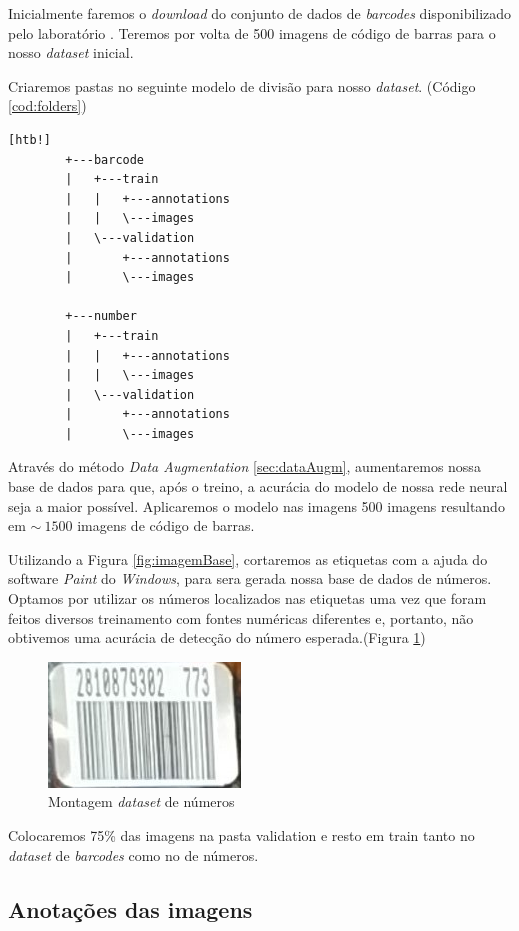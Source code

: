 Inicialmente faremos o \textit{download} do conjunto de dados de \textit{barcodes} disponibilizado pelo laboratório \citeauthor{Arte-Lab}. Teremos por volta de 500 imagens de código de barras para o nosso \textit{dataset} inicial.

Criaremos pastas no seguinte modelo de divisão para nosso \textit{dataset}. (Código \ref{cod:folders})
\begin{lstlisting}[caption=Divisão dos arquivos para dataset, label=cod:folders][htb!]
        +---barcode
        |   +---train
        |   |   +---annotations
        |   |   \---images
        |   \---validation
        |       +---annotations
        |       \---images
        
        +---number
        |   +---train
        |   |   +---annotations
        |   |   \---images
        |   \---validation
        |       +---annotations
        |       \---images
\end{lstlisting}

Através do método \textit{Data Augmentation} \ref{sec:dataAugm}, aumentaremos nossa base de dados para que, após o treino, a acurácia do modelo de nossa rede neural seja a maior possível. Aplicaremos o modelo nas imagens 500 imagens resultando em $\sim~1500$ imagens de código de barras.

Utilizando a Figura \ref{fig:imagemBase}, cortaremos as etiquetas com a ajuda do software \textit{Paint} do \textit{Windows}, para sera gerada nossa base de dados de números. Optamos por utilizar os números localizados nas etiquetas uma vez que foram feitos diversos treinamento com fontes numéricas diferentes e, portanto, não obtivemos uma acurácia de detecção do número esperada.(Figura \ref{fig:barcodeDataset})

\begin{figure}[htbp]
	\centering
	\includegraphics[width=0.25\linewidth]{figuras/MachineLearning/barcodeDataset.png}
	\caption{Montagem \textit{dataset} de números}
	\label{fig:barcodeDataset}
\end{figure}

Colocaremos 75\% das imagens na pasta validation e resto em train tanto no \textit{dataset} de \textit{barcodes} como no de números.

\subsection{Anotações das imagens}

